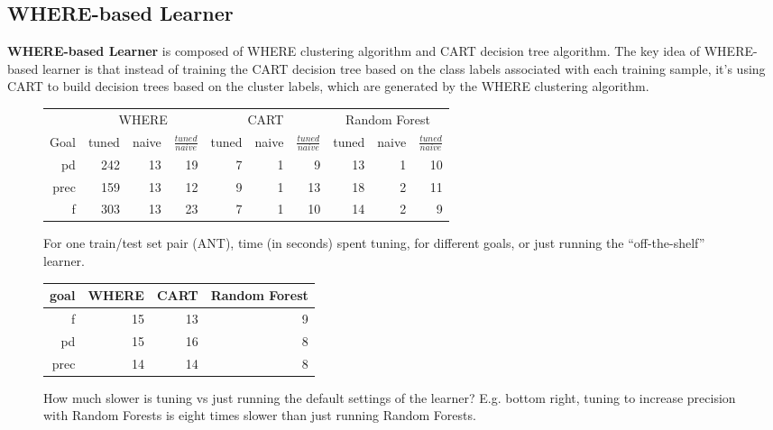 \documentclass{sig-alternative}
\def\baselinestretch{1}
\begin{document}
 \subsection{WHERE-based Learner}
\textbf{WHERE-based Learner} is composed of WHERE clustering algorithm and CART 
decision tree algorithm. The key idea of WHERE-based learner is that  instead of training the 
CART decision tree based on the class labels associated with each training sample, it's using 
CART to build decision trees based on the cluster labels, which are generated by the WHERE 
clustering algorithm.
 
 
 
\begin{figure}[!t]

\renewcommand{\baselinestretch}{0.8}
\scriptsize
\centering
  \begin{tabular}{r@{~}|r@{~}rr|r@{~}rr|r@{~}rr}
    & \multicolumn{3}{c|}{WHERE}&\multicolumn{3}{c|}{CART}& \multicolumn{3}{c}{Random Forest}\\\cline{2-10} 
    Goal & tuned & naive &$\frac{\mathit{tuned}}{\mathit{naive}}$& tuned & naive &$\frac{\mathit{tuned}}{\mathit{naive}}$& tuned & naive&$\frac{\mathit{tuned}}{\mathit{naive}}$\\\hline
pd&242&13&19&7&1&9&13&1&10\\ 
prec&159&13&12&9&1&13&18&2&11\\
f&303&13&23&7&1&10&14&2&9 
  \end{tabular}
  \caption{For one train/test set pair (ANT),  time (in seconds) spent tuning,
  for different goals, or just running the ``off-the-shelf'' learner.}
\end{figure}


\begin{figure}[!t]

\renewcommand{\baselinestretch}{0.8}
\scriptsize
\centering
\begin{tabular}{r|rrr}
goal &	WHERE	&CART&	Random Forest\\\hline
f	&15	&13	&9\\ 
pd	&15	&16	&8\\ 
prec&	14	&14	&8
\end{tabular}
\caption{How much slower is tuning vs just running the default
settings of the learner? E.g. bottom right, tuning to increase
precision with Random Forests is eight times slower than
just running Random Forests.}
\end{figure}
\end{document}
